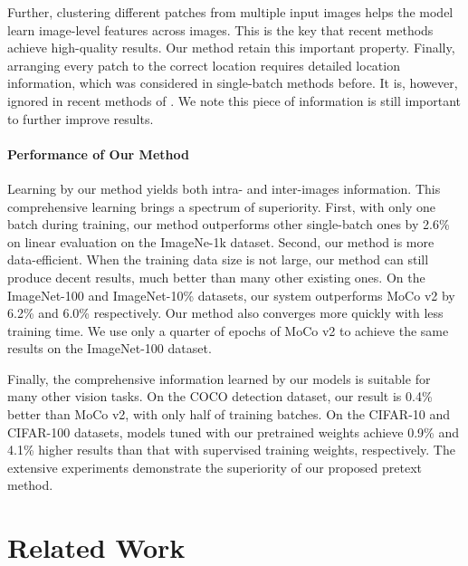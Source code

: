 \documentclass[final]{cvpr}
\begin{document}
Further, clustering different patches from multiple input images helps the model learn image-level features across images. This is the key that recent methods \cite{moco,mocov2,simclr} achieve high-quality results. Our method retain this important property.
Finally, arranging every patch to the correct location requires detailed location information, which was considered in single-batch methods \cite{jigpuz,colorization} before. It is, however, ignored in recent methods of \cite{simclr,pirl,moco,mocov2,pcl}. We note this piece of information is still important to further improve results. 

\paragraph{Performance of Our Method} Learning by our method yields both intra- and inter-images information. This comprehensive learning brings a spectrum of superiority. First, with only one batch during training, our method outperforms other single-batch ones by 2.6\% on linear evaluation on the ImageNe-1k dataset.
Second, our method is more data-efficient. When the training data size is not large, our method can still produce decent results, much better than many other existing ones. On the ImageNet-100 and ImageNet-10\% datasets, our system outperforms MoCo v2 by 6.2\% and 6.0\% respectively.
Our method also converges more quickly with less training time. We use only a quarter of epochs of MoCo v2 to achieve the same results on the ImageNet-100 dataset.

Finally, the comprehensive information learned by our models is suitable for many other vision tasks. On the COCO detection dataset, our result is 0.4\% better than MoCo v2, with only half of training batches. On the CIFAR-10 and CIFAR-100 datasets, models tuned with our pretrained weights achieve 0.9\% and 4.1\% higher results than that with supervised training weights, respectively.
The extensive experiments demonstrate the superiority of our proposed pretext method.

\section{Related Work}
\end{document}
